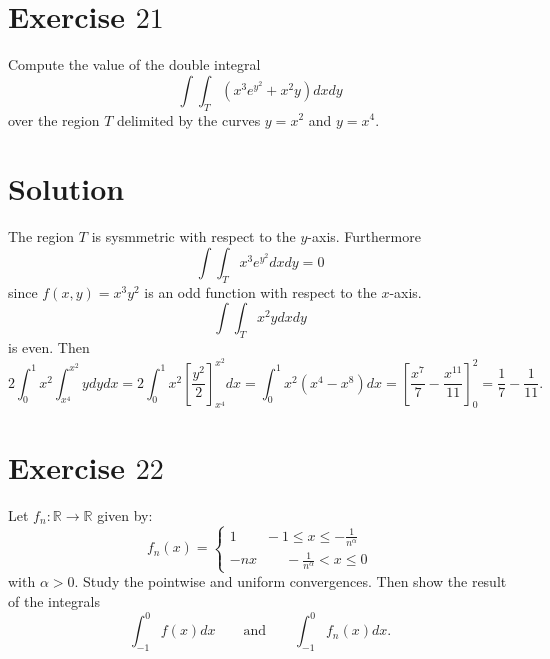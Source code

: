 \documentclass[a4paper, twoside, openany]{book}
\newcommand{\R}{\mathbb{R}}
\begin{document}
\section*{Exercise $21$}
Compute the value of the double integral
$$\int \int_T (x^3 e^{y^2} + x^2 y) dx dy$$
over the region $T$ delimited by the curves $y = x^2$ and $y = x^4$.
\section*{Solution}
\begin{figure}[!ht]
\begin{center}
\end{center}
\end{figure}
The region $T$ is sysmmetric with respect to the $y$-axis. Furthermore
$$\int \int_{T} x^3 e^{y^2} dx dy = 0$$
since $f(x, y) = x^3 y^2$ is an odd function with respect to the $x$-axis. 
$$\int \int_{T} x^2 y dx dy$$
is even. Then
$$2 \int_0^1 x^2 \int_{x^4}^{x^2} y dy dx = 2 \int_0^1 x^2 [\frac{y^2}{2}]_{x^4}^{x^2} dx = \int_0^1 x^2(x^4 - x^8) dx = [\frac{x^7}{7} - \frac{x^11}{11}]_0^2 = \frac{1}{7} - \frac{1}{11}.$$
\clearpage
\section*{Exercise $22$}
Let $f_n: \R \rightarrow \R$ given by:
$$
f_n(x) = 
\begin{cases}
1 \qquad   -1 \leq x \leq -\frac{1}{n^{\alpha}} \\	
-nx \qquad -\frac{1}{n^{\alpha}} < x \leq 0 
\end{cases}$$
with $\alpha > 0$. Study the pointwise and uniform convergences. Then show the result of the integrals
$$\int_{-1}^0 f(x) dx \qquad \textrm{and} \qquad \int_{-1}^0 f_n(x) dx.$$
\end{document}
